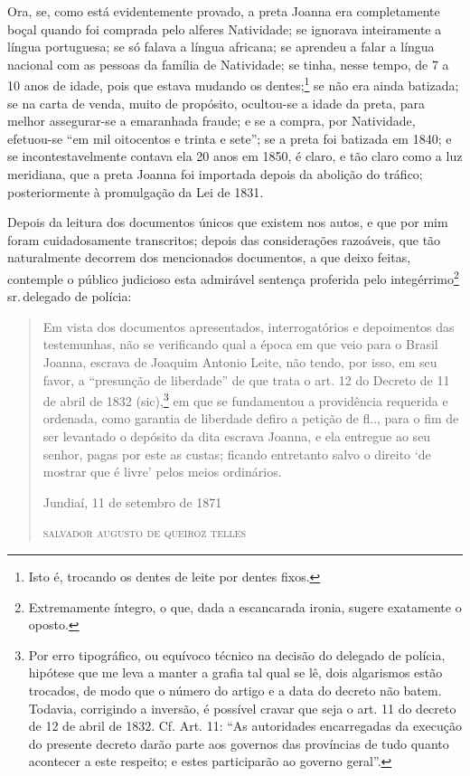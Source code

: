 Ora, se, como está evidentemente provado, a preta Joanna era
completamente boçal quando foi comprada pelo alferes Natividade; se
ignorava inteiramente a língua portuguesa; se só falava a língua
africana; se aprendeu a falar a língua nacional com as pessoas da
família de Natividade; se tinha, nesse tempo, de 7 a 10 anos de idade,
pois que estava mudando os dentes;\footnote{ Isto é, trocando os dentes
  de leite por dentes fixos.} se não era ainda batizada; se na carta de
venda, muito de propósito, ocultou-se a idade da preta, para melhor
assegurar-se a emaranhada fraude; e se a compra, por Natividade,
efetuou-se ``em mil oitocentos e trinta e sete''; se a preta foi batizada
em 1840; e se incontestavelmente contava ela 20 anos em 1850, é claro, e
tão claro como a luz meridiana, que a preta Joanna foi importada depois
da abolição do tráfico; posteriormente à promulgação da Lei de 1831.

Depois da leitura dos documentos únicos que existem nos autos, e que por
mim foram cuidadosamente transcritos; depois das considerações
razoáveis, que tão naturalmente decorrem dos mencionados documentos, a
que deixo feitas, contemple o público judicioso esta admirável sentença
proferida pelo integérrimo\footnote{ Extremamente íntegro, o que, dada
  a escancarada ironia, sugere exatamente o oposto.} sr.\,delegado de
polícia:

\begin{quote}
Em vista dos documentos apresentados, interrogatórios e depoimentos das
testemunhas, não se verificando qual a época em que veio para o Brasil
Joanna, escrava de Joaquim Antonio Leite, não tendo, por isso, em seu
favor, a ``presunção de liberdade'' de que trata o art. 12 do Decreto de
11 de abril de 1832 (sic),\footnote{ Por erro tipográfico, ou equívoco
  técnico na decisão do delegado de polícia, hipótese que me leva a
  manter a grafia tal qual se lê, dois algarismos estão trocados, de
  modo que o número do artigo e a data do decreto não batem. Todavia,
  corrigindo a inversão, é possível cravar que seja o art. 11 do decreto
  de 12 de abril de 1832. Cf. Art. 11: ``As autoridades encarregadas da execução
  do presente decreto darão parte aos governos das províncias de tudo
  quanto acontecer a este respeito; e estes participarão ao governo
  geral''.} em que se fundamentou a providência requerida e ordenada,
como garantia de liberdade defiro a petição de fl.., para o fim de ser
levantado o depósito da dita escrava Joanna, e ela entregue ao seu
senhor, pagas por este as custas; ficando entretanto salvo o direito `de
mostrar que é livre' pelos meios ordinários.

\begin{flushright}
Jundiaí, 11 de setembro de 1871

\textsc{salvador augusto de queiroz telles}
\end{flushright}
\end{quote}


